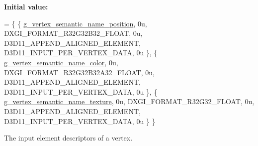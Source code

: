 {\bfseries Initial value\+:}
\begin{DoxyCode}
= \{
        \{ \mbox{\hyperlink{namespacemage_1_1rendering_1_1anonymous__namespace_02vertex_8cpp_03_a6e875b92e4de38b14e8dc404df41a5ad}{g\_vertex\_semantic\_name\_position}}, 0u, DXGI\_FORMAT\_R32G32B32\_FLOAT, 
         0u, D3D11\_APPEND\_ALIGNED\_ELEMENT, D3D11\_INPUT\_PER\_VERTEX\_DATA, 0u \},
        \{ \mbox{\hyperlink{namespacemage_1_1rendering_1_1anonymous__namespace_02vertex_8cpp_03_aae8cd813faec1e62d4e6463db8c99ab5}{g\_vertex\_semantic\_name\_color}},    0u, DXGI\_FORMAT\_R32G32B32A32\_FLOAT, 
      0u, D3D11\_APPEND\_ALIGNED\_ELEMENT, D3D11\_INPUT\_PER\_VERTEX\_DATA, 0u \},
        \{ \mbox{\hyperlink{namespacemage_1_1rendering_1_1anonymous__namespace_02vertex_8cpp_03_a76de570f9dcc80db1e8e2f0a19536085}{g\_vertex\_semantic\_name\_texture}},  0u, DXGI\_FORMAT\_R32G32\_FLOAT,     
        0u, D3D11\_APPEND\_ALIGNED\_ELEMENT, D3D11\_INPUT\_PER\_VERTEX\_DATA, 0u \}
    \}
\end{DoxyCode}
The input element descriptors of a vertex. 